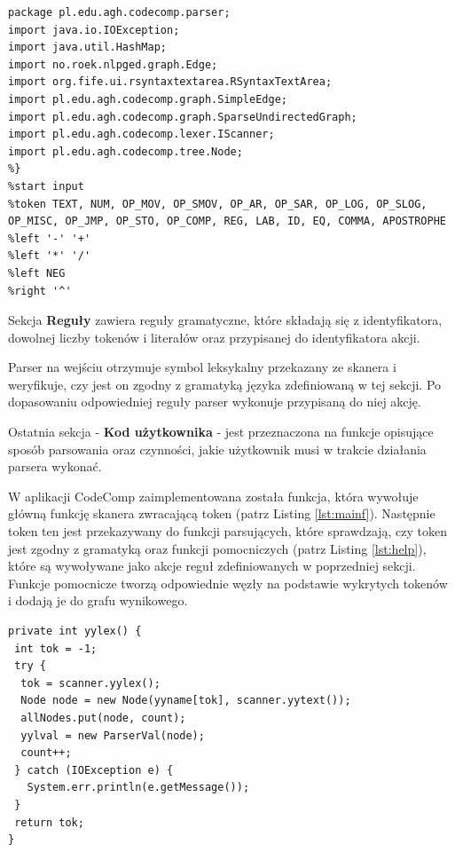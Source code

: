 \documentclass[a4paper,12pt]{article}
\begin{document}
\begin{lstlisting}[caption={Sekcja deklaracji analizatora składniowego w programie CodeComp.}, label={lst:dec}]
%{
package pl.edu.agh.codecomp.parser;
import java.io.IOException;
import java.util.HashMap;
import no.roek.nlpged.graph.Edge;
import org.fife.ui.rsyntaxtextarea.RSyntaxTextArea;
import pl.edu.agh.codecomp.graph.SimpleEdge;
import pl.edu.agh.codecomp.graph.SparseUndirectedGraph;
import pl.edu.agh.codecomp.lexer.IScanner;
import pl.edu.agh.codecomp.tree.Node;
%}
%start input 
%token TEXT, NUM, OP_MOV, OP_SMOV, OP_AR, OP_SAR, OP_LOG, OP_SLOG, OP_MISC, OP_JMP, OP_STO, OP_COMP, REG, LAB, ID, EQ, COMMA, APOSTROPHE
%left '-' '+'
%left '*' '/'
%left NEG
%right '^'
\end{lstlisting}

Sekcja \textbf{Reguły} zawiera reguły gramatyczne, które składają się z identyfikatora, dowolnej liczby tokenów i literałów oraz przypisanej do identyfikatora akcji.

Parser na wejściu otrzymuje symbol leksykalny przekazany ze skanera i weryfikuje, czy jest on zgodny z gramatyką języka zdefiniowaną w tej sekcji. Po dopasowaniu odpowiedniej reguły parser wykonuje przypisaną do niej akcję.


Ostatnia sekcja - \textbf{Kod użytkownika} - jest przeznaczona na funkcje opisujące sposób parsowania oraz czynności, jakie użytkownik musi w trakcie działania parsera wykonać.

W aplikacji CodeComp zaimplementowana została funkcja, która wywołuje główną funkcję skanera zwracającą token (patrz Listing \ref{lst:mainf}). Następnie token ten jest przekazywany do funkcji parsujących, które sprawdzają, czy token jest zgodny z gramatyką oraz funkcji pomocniczych (patrz Listing \ref{lst:help}), które są wywoływane jako akcje reguł zdefiniowanych w poprzedniej sekcji. Funkcje pomocnicze tworzą odpowiednie węzły na podstawie wykrytych tokenów i dodają je do grafu wynikowego.

\begin{lstlisting}[caption={Główna funkcja parsera.}, label={lst:mainf}]
private int yylex() {
 int tok = -1;
 try {
  tok = scanner.yylex();		
  Node node = new Node(yyname[tok], scanner.yytext());
  allNodes.put(node, count);
  yylval = new ParserVal(node);
  count++;
 } catch (IOException e) {
   System.err.println(e.getMessage());
 }
 return tok;
}
\end{lstlisting}
\\ \\
\end{document}
